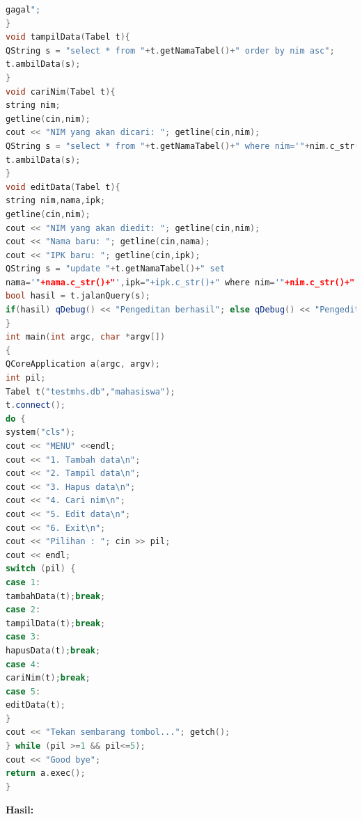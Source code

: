 \begin{enumerate}
\begin{lstlisting}[language=c++, caption= Pembuatan manipulasi data pada SQLite dengan menggunakan menu]
gagal";
}
void tampilData(Tabel t){
QString s = "select * from "+t.getNamaTabel()+" order by nim asc";
t.ambilData(s);
}
void cariNim(Tabel t){
string nim;
getline(cin,nim);
cout << "NIM yang akan dicari: "; getline(cin,nim);
QString s = "select * from "+t.getNamaTabel()+" where nim='"+nim.c_str()+"'";
t.ambilData(s);
}
void editData(Tabel t){
string nim,nama,ipk;
getline(cin,nim);
cout << "NIM yang akan diedit: "; getline(cin,nim);
cout << "Nama baru: "; getline(cin,nama);
cout << "IPK baru: "; getline(cin,ipk);
QString s = "update "+t.getNamaTabel()+" set
nama='"+nama.c_str()+"',ipk="+ipk.c_str()+" where nim='"+nim.c_str()+"'";
bool hasil = t.jalanQuery(s);
if(hasil) qDebug() << "Pengeditan berhasil"; else qDebug() << "Pengeditan gagal";
}
int main(int argc, char *argv[])
{
QCoreApplication a(argc, argv);
int pil;
Tabel t("testmhs.db","mahasiswa");
t.connect();
do {
system("cls");
cout << "MENU" <<endl;
cout << "1. Tambah data\n";
cout << "2. Tampil data\n";
cout << "3. Hapus data\n";
cout << "4. Cari nim\n";
cout << "5. Edit data\n";
cout << "6. Exit\n";
cout << "Pilihan : "; cin >> pil;
cout << endl;
switch (pil) {
case 1:
tambahData(t);break;
case 2:
tampilData(t);break;
case 3:
hapusData(t);break;
case 4:
cariNim(t);break;
case 5:
editData(t);
}
cout << "Tekan sembarang tombol..."; getch();
} while (pil >=1 && pil<=5);
cout << "Good bye";
return a.exec();
}
\end{lstlisting}
\end{enumerate}

\textbf{Hasil:}

